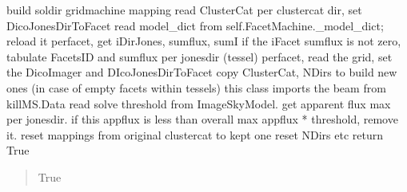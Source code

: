 \documentclass[letterpaper,10pt,english]{sphinxmanual}
\begin{document}
\begin{fulllineitems}
\begin{fulllineitems}
\label{\detokenize{api/killMS.Predict:killMS.Predict.ClassImageSM2.ClassPreparePredict.PrepareGridMachinesMapping}}
\pysigstartsignatures
{}
\pysigstopsignatures
\sphinxAtStartPar
build soldir \sphinxhyphen{} gridmachine mapping
read ClusterCat
per clustercat dir, set DicoJonesDirToFacet
read model\_dict from self.FacetMachine.\_model\_dict; reload it
per\sphinxhyphen{}facet, get iDirJones, sumflux, sumI
if the iFacet sumflux is not zero, tabulate FacetsID and sumflux per jonesdir (tessel)
per\sphinxhyphen{}facet, read the grid, set the DicoImager and DIcoJonesDirToFacet
copy ClusterCat, NDirs to build new ones (in case of empty facets within tessels)
this class imports the beam from killMS.Data
read solve threshold from ImageSkyModel.
get apparent flux max per jones\sphinxhyphen{}dir.
if this appflux is less than overall max appflux * threshold, remove it.
reset mappings from original clustercat to kept one
reset NDirs etc
return True
\begin{quote}\begin{description}
\sphinxAtStartPar
True

\end{description}\end{quote}

\end{fulllineitems}


\end{fulllineitems}

\end{document}
